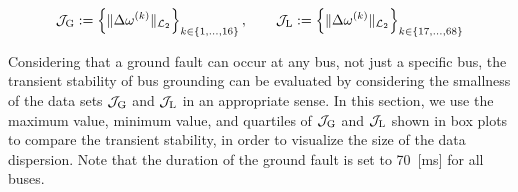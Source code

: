 \documentclass[graybox, envcountchap]{svmult}
\begin{document}
\begin{equation*}%
  \mathcal{J}_{\rm G}:=
  \left\{
  \| \Delta \omega^{(k)} \|_{\mathcal{L}_2}
  \right\}_{k\in \{1,\ldots,16\} }
  ,\qquad
  \mathcal{J}_{\rm L}
  :=
  \left\{
  \| \Delta \omega^{(k)} \|_{\mathcal{L}_2}
  \right\}_{k\in \{17,\ldots,68\} }
\end{equation*}

Considering that a ground fault can occur at any bus, not just a specific bus,
the transient stability of bus grounding can be evaluated by considering the
smallness of the data sets $\mathcal{J}_{\rm G}$ and $\mathcal{J}_{\rm L}$ in an
appropriate sense. In this section, we use the maximum value, minimum value, and
quartiles of $\mathcal{J}_{\rm G}$ and $\mathcal{J}_{\rm L}$ shown in box plots
to compare the transient stability, in order to visualize the size of the data
dispersion. Note that the duration of the ground fault is set to 70~[ms] for all
buses.
\end{document}
